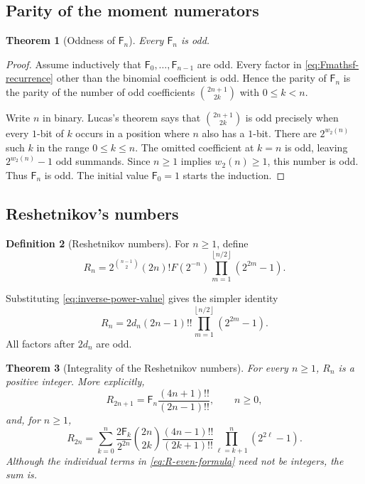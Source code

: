 \documentclass[11pt,oneside]{article}
\newtheorem{theorem}{Theorem}[section]
\theoremstyle{definition}
\newtheorem{definition}[theorem]{Definition}
\theoremstyle{remark}
\newcommand{\wt}{w_2}
\newcommand{\floor}[1]{\left\lfloor#1\right\rfloor}
\begin{document}
\subsection{Parity of the moment numerators}

\begin{theorem}[Oddness of $\mathsf F_n$]\label{thm:Fmathsf-odd}
Every $\mathsf F_n$ is odd.
\end{theorem}

\begin{proof}
Assume inductively that $\mathsf F_0,\ldots,\mathsf F_{n-1}$ are odd.  Every
factor in \eqref{eq:Fmathsf-recurrence} other than the binomial coefficient is
odd.  Hence the parity of $\mathsf F_n$ is the parity of the number of odd
coefficients $\binom{2n+1}{2k}$ with $0\le k<n$.

Write $n$ in binary.  Lucas's theorem says that
$\binom{2n+1}{2k}$ is odd precisely when every $1$-bit of $k$ occurs in a position
where $n$ also has a $1$-bit.  There are $2^{\wt(n)}$ such $k$ in the range
$0\le k\le n$.  The omitted coefficient at $k=n$ is odd, leaving
$2^{\wt(n)}-1$ odd summands.  Since $n\ge1$ implies $\wt(n)\ge1$, this number is
odd.  Thus $\mathsf F_n$ is odd.  The initial value $\mathsf F_0=1$ starts the
induction.
\end{proof}

\subsection{Reshetnikov's numbers}

\begin{definition}[Reshetnikov numbers]\label{def:R-numbers}
For $n\ge1$, define
\begin{equation}\label{eq:R-number-def}
 R_n=2^{\binom{n-1}{2}}(2n)!F(2^{-n})
 \prod_{m=1}^{\floor{n/2}}(2^{2m}-1).
\end{equation}
\end{definition}

Substituting \eqref{eq:inverse-power-value} gives the simpler identity
\begin{equation}\label{eq:R-via-d}
 R_n=2d_n(2n-1)!!
 \prod_{m=1}^{\floor{n/2}}(2^{2m}-1).
\end{equation}
All factors after $2d_n$ are odd.

\begin{theorem}[Integrality of the Reshetnikov numbers]\label{thm:R-integral}
For every $n\ge1$, $R_n$ is a positive integer.  More explicitly,
\begin{equation}\label{eq:R-odd-formula}
 R_{2n+1}=\mathsf F_n\frac{(4n+1)!!}{(2n-1)!!},
 \qquad n\ge0,
\end{equation}
and, for $n\ge1$,
\begin{equation}\label{eq:R-even-formula}
 R_{2n}=\sum_{k=0}^{n}
 \frac{2\mathsf F_k}{2^{2n}}\binom{2n}{2k}
 \frac{(4n-1)!!}{(2k+1)!!}
 \prod_{\ell=k+1}^{n}(2^{2\ell}-1).
\end{equation}
Although the individual terms in \eqref{eq:R-even-formula} need not be integers,
the sum is.
\end{theorem}
\end{document}
